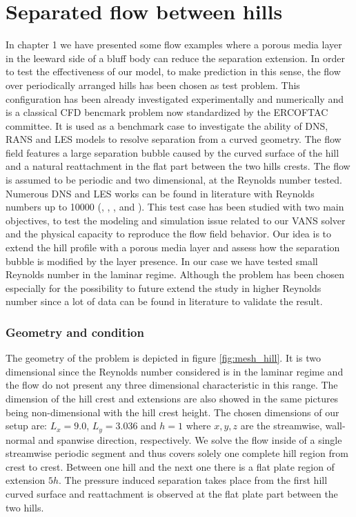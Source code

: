 \section{Separated flow between hills}
In chapter 1 we have presented some flow examples where a porous media layer in the leeward side of a bluff body can reduce the separation extension. In order to test the effectiveness of our model, to make prediction in this sense, the flow over periodically arranged hills has been chosen as test problem. This configuration has been already investigated experimentally and numerically and is a classical CFD bencmark problem now standardized by the ERCOFTAC committee.
It is used as a benchmark case to investigate the ability of DNS, RANS and LES models to resolve separation from a curved geometry.
The flow field features a large separation bubble caused by the curved surface of the hill and a natural reattachment in the flat part between the two hills crests. 
The flow is assumed to be periodic and two dimensional, at the Reynolds number tested. Numerous DNS and LES works can be found in literature with Reynolds numbers up to 10000 (\citet{chang2014simulations}, \citet{breuer2005issues}, \citet{breuer2009flow}, \cite{almeida1993wake} and \cite{temmerman2001large}).
This test case has been studied with two main objectives, to test the modeling and simulation issue related to our VANS solver and the physical capacity to reproduce the flow field behavior. 
Our idea is to extend the hill profile with a porous media layer and assess how the separation bubble is modified by the layer presence.
In our case we have tested small Reynolds number in the laminar regime. Although the problem has been chosen especially for the possibility to future extend the study in higher Reynolds number since a lot of data can be found in literature to validate the result.

\subsubsection{Geometry and condition}
The geometry of the problem is depicted in figure \ref{fig:mesh_hill}. It is two dimensional since the Reynolds number considered is in the laminar regime and the flow do not present any three dimensional characteristic in this range. The dimension of the hill crest and extensions are also showed in the same pictures being non-dimensional with the hill crest height. The chosen dimensions of our setup are: $L_x = 9.0$, $L_y = 3.036$ and $h = 1$ where $x,y,z$ are the streamwise, wall-normal and spanwise direction, respectively. We solve the flow inside of a single streamwise periodic segment and thus covers solely one complete hill region from crest to crest.
Between one hill and the next one there is a flat plate region of extension $5h$. The pressure induced separation takes place from the first hill curved surface and reattachment is observed at the flat plate part between the two hills.


